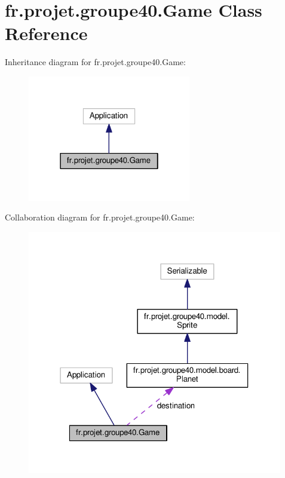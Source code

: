 \hypertarget{classfr_1_1projet_1_1groupe40_1_1_game}{}\section{fr.\+projet.\+groupe40.\+Game Class Reference}
\label{classfr_1_1projet_1_1groupe40_1_1_game}


Inheritance diagram for fr.\+projet.\+groupe40.\+Game\+:\nopagebreak
\begin{figure}[H]
\begin{center}
\leavevmode
\includegraphics[width=202pt]{classfr_1_1projet_1_1groupe40_1_1_game__inherit__graph}
\end{center}
\end{figure}


Collaboration diagram for fr.\+projet.\+groupe40.\+Game\+:\nopagebreak
\begin{figure}[H]
\begin{center}
\leavevmode
\includegraphics[width=316pt]{classfr_1_1projet_1_1groupe40_1_1_game__coll__graph}
\end{center}
\end{figure}
